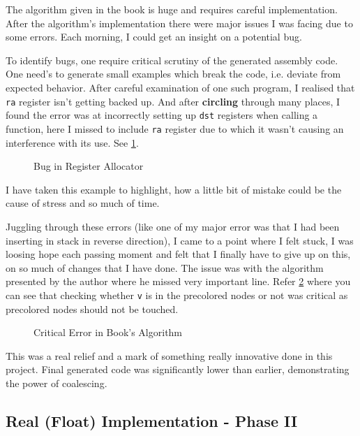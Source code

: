 The algorithm given in the book is huge and requires careful implementation. After the algorithm's implementation there were major issues I was facing due to some errors. Each morning, I could get an insight on a potential bug. 

To identify bugs, one require critical scrutiny of the generated assembly code. One need's to generate small examples which break the code, i.e. deviate from expected behavior. After careful examination of one such program, I realised that \texttt{ra} register isn't getting backed up. And after \textbf{circling} through many places, I found the error was at incorrectly setting up \texttt{dst} registers when calling a function, here I missed to include \texttt{ra} register due to which it wasn't causing an interference with its use. See \ref{fig:eb}.

\begin{figure}
\centering
{}
\caption{Bug in Register Allocator}
\label{fig:eb}
\end{figure}

I have taken this example to highlight, how a little bit of mistake could be the cause of stress and so much of time.

Juggling through these errors (like one of my major error was that I had been inserting in stack in reverse direction), I came to a point where I felt stuck, I was loosing hope each passing moment and felt that I finally have to give up on this, on so much of changes that I have done. The issue was with the algorithm presented by the author where he missed very important line. Refer \ref{fig:culprit} where you can see that checking whether \texttt{v} is in the precolored nodes or not was critical as precolored nodes should not be touched. 

\begin{figure}
\centering
{}
\caption{Critical Error in Book's Algorithm}
\label{fig:culprit}
\end{figure}

This was a real relief and a mark of something really innovative done in this project. Final generated code was significantly lower than earlier, demonstrating the power of coalescing. 

\subsection{Real (Float) Implementation - Phase II}

